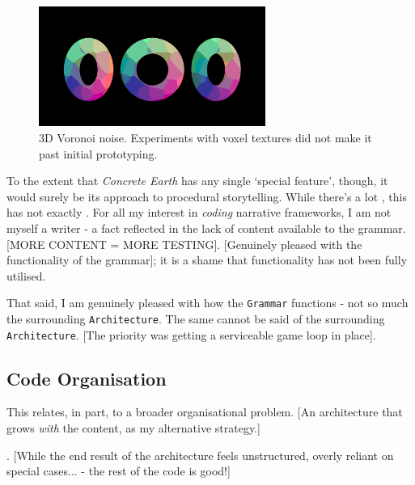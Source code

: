 \documentclass[a4paper, 11pt]{article}
\begin{document}
\begin{flushleft}
\vspace{5pt}\noindent
\begin{figure}[h]
\centering
\includegraphics[width=0.66\textwidth]{Euclidean Voronoi Voxel}
\caption{3D Voronoi noise. Experiments with voxel textures did not make it past initial prototyping.}
\label{Euclidean Voronoi Voxel}
\end{figure}

\vspace{5pt}\noindent
To the extent that \textit{Concrete Earth} has any single `special feature', though, it would surely be its approach to procedural storytelling. While there's a lot , this has not exactly . For all my interest in \textit{coding} narrative frameworks, I am not myself a writer - a fact reflected in the lack of content available to the grammar. [MORE CONTENT = MORE TESTING]. [Genuinely pleased with the functionality of the grammar]; it is a shame that functionality has not been fully utilised. %

\vspace{5pt}\noindent
That said, I am genuinely pleased with how the \texttt{Grammar} functions - not so much the surrounding \texttt{Architecture}. 
The same cannot be said of the surrounding \texttt{Architecture}. [The priority was getting a serviceable game loop in place].

\subsection{Code Organisation}

This relates, in part, to a broader organisational problem. [An architecture that grows \textit{with} the content, as my alternative strategy.]

\vspace{5pt}. [While the end result of the architecture feels unstructured, overly reliant on special cases... - the rest of the code is good!]


\end{flushleft}
\end{document}
